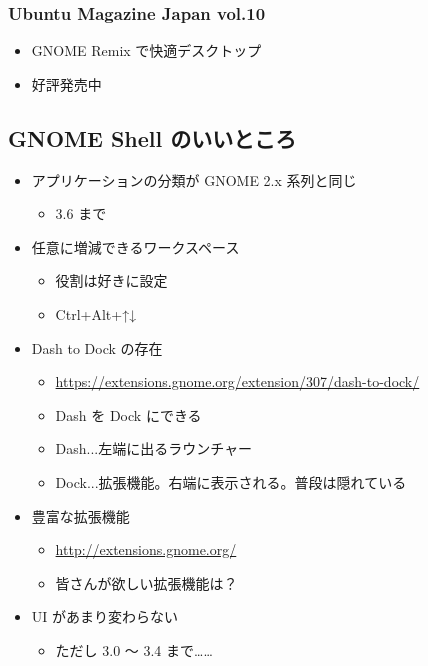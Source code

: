 \documentclass[mingoth,a4paper]{jsarticle}
\begin{document}
\subsubsection{Ubuntu Magazine Japan vol.10}
\begin{itemize}
  \item GNOME Remix で快適デスクトップ
  \item 好評発売中
\end{itemize}

\subsection{GNOME Shell のいいところ}
\begin{itemize}
  \item アプリケーションの分類が GNOME 2.x 系列と同じ
  \begin{itemize}
    \item 3.6 まで
  \end{itemize}

  \item 任意に増減できるワークスペース
  \begin{itemize}
    \item 役割は好きに設定
    \item Ctrl+Alt+↑↓
  \end{itemize}

  \item Dash to Dock の存在
  \begin{itemize}
    \item \url{https://extensions.gnome.org/extension/307/dash-to-dock/}
    \item Dash を Dock にできる
    \item Dash...左端に出るラウンチャー
    \item Dock...拡張機能。右端に表示される。普段は隠れている
  \end{itemize}

  \item 豊富な拡張機能
  \begin{itemize}
    \item \url{http://extensions.gnome.org/}
    \item 皆さんが欲しい拡張機能は？
  \end{itemize}

  \item UI があまり変わらない
  \begin{itemize}
    \item ただし 3.0 〜 3.4 まで……
  \end{itemize}
\end{itemize}
\end{document}
